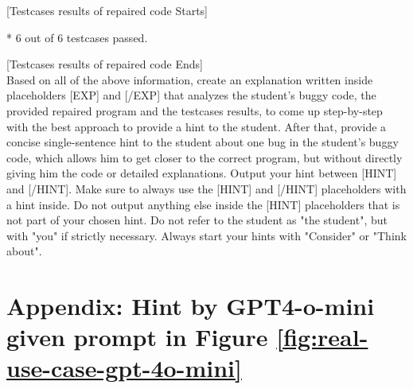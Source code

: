\documentclass{article}
\begin{document}
\begin{figure*}[h!]
\begin{tcolorbox}[colframe=black!10!white, colback=black!5!white]
\begin{minipage}{\textwidth}
            [Testcases results of repaired code Starts]

            * 6 out of 6 testcases passed.

            [Testcases results of repaired code Ends]\\
            
            Based on all of the above information, create an explanation written inside placeholders [EXP] and [/EXP] that analyzes the student's buggy code, the provided repaired program and the testcases results, to come up step-by-step with the best approach to provide a hint to the student. After that, provide a concise single-sentence hint to the student about one bug in the student's buggy code, which allows him to get closer to the correct program, but without directly giving him the code or detailed explanations. Output your hint between [HINT] and [/HINT]. Make sure to always use the [HINT] and [/HINT] placeholders with a hint inside. Do not output anything else inside the [HINT] placeholders that is not part of your chosen hint. Do not refer to the student as "the student", but with "you" if strictly necessary. Always start your hints with "Consider" or "Think about".
        \end{minipage}
    \end{tcolorbox}
    \caption{An example of the advanced prompt being used to query GPT-4o-mini. Notice that the repaired program created by GPT-4o-mini passes 6 out of 6 test cases, thus it's a correct repaired program that can be used as context to generate a hint. \emph{Prompt was shortened for brevity.}}
    \label{fig:real-use-case-gpt-4o-mini}
\end{figure*}

\clearpage

\section{Appendix: Hint by GPT4-o-mini given prompt in Figure \ref{fig:real-use-case-gpt-4o-mini}}\label{appendix:real-use-case-gpt4o-mini-response}
\end{document}
